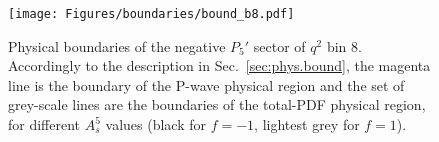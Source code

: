 \begin{figure}[!hbt]
  \centering
  \texttt{[image: Figures/boundaries/bound\_b8.pdf]}
  \caption{Physical boundaries of the negative $P_5'$ sector of $q^2$ bin 8. Accordingly to the description in Sec.~\ref{sec:phys.bound}, the magenta line is the boundary of the P-wave physical region and the set of grey-scale lines are the boundaries of the total-PDF physical region, for different $A_s^5$ values (black for $f=-1$, lightest grey for $f=1$).}
  \label{fig:bound8}
\end{figure}
